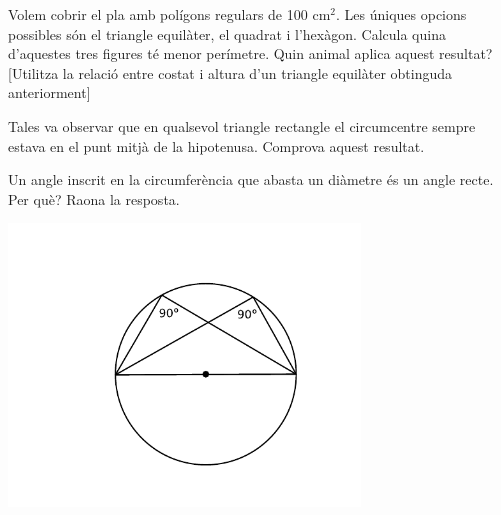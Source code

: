 \begin{mylist}
\exer  Volem cobrir el pla amb polígons regulars de 100 cm${}^{2}$. Les úniques opcions possibles són el triangle equilàter, el quadrat i l'hexàgon. Calcula quina d'aquestes tres figures té menor perímetre. Quin animal aplica aquest resultat? [Utilitza la relació entre costat i altura d'un triangle equilàter obtinguda anteriorment]

\exer  Tales va observar que en qualsevol triangle rectangle el circumcentre sempre estava en el punt mitjà de la hipotenusa. Comprova aquest resultat.

\vspace{-1.5cm}
\exer \begin{minipage}[t]{0.7\textwidth}
	Un angle inscrit en la circumferència que abasta un diàmetre és un angle recte. Per què? Raona la resposta.
\end{minipage}
\begin{minipage}{0.3\textwidth}
	\centering
	\vspace{1.5cm}
\includegraphics[width=0.7\textwidth]{img-09/fig8}
\end{minipage}


\end{mylist}
